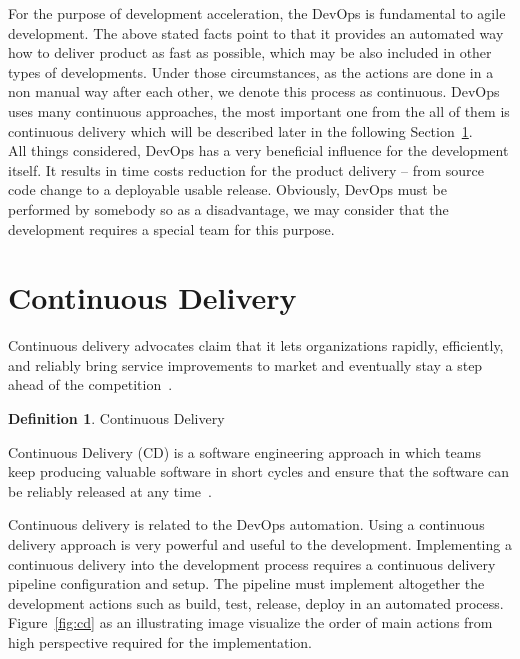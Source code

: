 \documentclass[12pt,a4paper]{article}
\theoremstyle{definition}
\newtheorem{definition}{Definition}[section]
\begin{document}
    For the purpose of development acceleration, the DevOps is fundamental to agile development. The above stated facts point to that it provides an automated way how to deliver product as fast as possible, which may be also included in other types of developments. Under those circumstances, as the actions are done in a non manual way after each other, we denote this process as continuous. DevOps uses many continuous approaches, the most important one from the all of them is continuous delivery which will be described later in the following Section~\ref{sec:CD}.\\

    All things considered, DevOps has a very beneficial influence for the development itself. It results in time costs reduction for the product delivery -- from source code change to a deployable usable release. Obviously, DevOps must be performed by somebody so as a disadvantage, we may consider that the development requires a special team for this purpose.

\section{Continuous Delivery}\label{sec:CD}

    Continuous delivery advocates claim that it lets organizations rapidly, efficiently, and reliably bring service improvements to market and eventually stay a step ahead of the competition~\cite{cd-book}.

    \begin{definition}
        Continuous Delivery\\[-5mm]
        \begin{center}
            \begin{minipage}{0.9\textwidth}
                Continuous Delivery (CD) is a software engineering approach in which teams keep producing valuable software in short cycles and ensure that the software can be reliably released at any time~\cite{8452107}.\\[-2.5mm]
            \end{minipage}
        \end{center}
    \end{definition}

    Continuous delivery is related to the DevOps automation. Using a continuous delivery approach is very powerful and useful to the development. Implementing a continuous delivery into the development process requires a continuous delivery pipeline configuration and setup. The pipeline must implement altogether the development actions such as build, test, release, deploy in an automated process. Figure~\ref{fig:cd} as an illustrating image visualize the order of main actions from high perspective required for the implementation.
\end{document}
